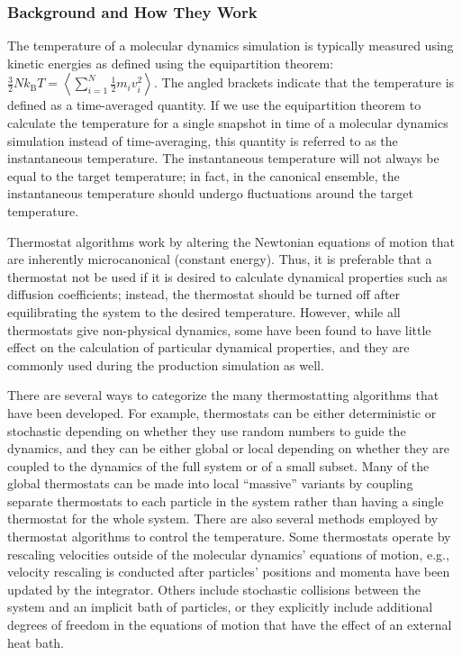 \documentclass[9pt,bestpractices]{livecoms}
\begin{document}
\subsubsection{Background and How They Work}

The temperature of a molecular dynamics simulation is typically measured using kinetic energies as defined using the equipartition theorem: $\frac{3}{2} N k_{\text{B}} T = \left<\sum_{i=1}^{N} \frac{1}{2} m_i v_i^2\right>$.
The angled brackets indicate that the temperature is defined as a time-averaged quantity.
If we use the equipartition theorem to calculate the temperature for a single snapshot in time of a molecular dynamics simulation instead of time-averaging, this quantity is referred to as the instantaneous temperature.
The instantaneous temperature will not always be equal to the target temperature; in fact, in the canonical ensemble, the instantaneous temperature should undergo fluctuations around the target temperature.

Thermostat algorithms work by altering the Newtonian equations of motion that are inherently microcanonical (constant energy).
Thus, it is preferable that a thermostat not be used if it is desired to calculate dynamical properties such as diffusion coefficients; instead, the thermostat should be turned off after equilibrating the system to the desired temperature.
However, while all thermostats give non-physical dynamics, some have been found to have little effect on the calculation of particular dynamical properties, and they are commonly used during the production simulation as well\cite{Basconi:2013:JChemTheoryComput}.

There are several ways to categorize the many thermostatting algorithms that have been developed.
For example, thermostats can be either deterministic or stochastic depending on whether they use random numbers to guide the dynamics, and they can be either global or local depending on whether they are coupled to the dynamics of the full system or of a small subset.
Many of the global thermostats can be made into local ``massive'' variants by coupling separate thermostats to each particle in the system rather than having a single thermostat for the whole system.
There are also several methods employed by thermostat algorithms to control the temperature.
Some thermostats operate by rescaling velocities outside of the molecular dynamics' equations of motion, e.g., velocity rescaling is conducted after particles' positions and momenta have been updated by the integrator.
Others include stochastic collisions between the system and an implicit bath of particles, or they explicitly include additional degrees of freedom in the equations of motion that have the effect of an external heat bath.
\end{document}
